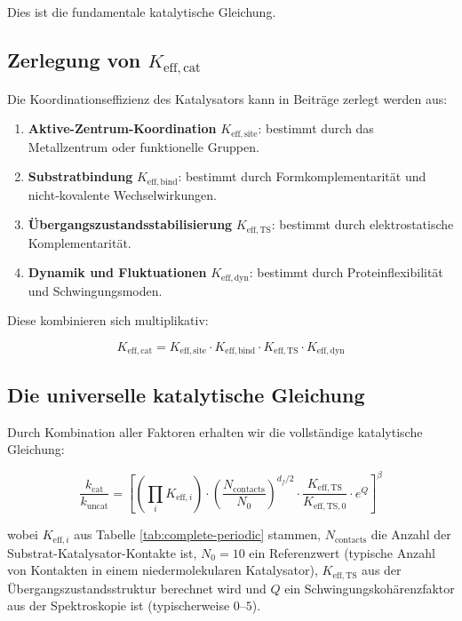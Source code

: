 \documentclass[12pt,a4paper]{article}
\newcommand{\df}{d_{\!f}}
\begin{document}
	Dies ist die fundamentale katalytische Gleichung.
	
	\subsection{Zerlegung von \(K_{\mathrm{eff},\text{cat}}\)}
	
	Die Koordinationseffizienz des Katalysators kann in Beiträge zerlegt werden aus:
	\begin{enumerate}
		\item \textbf{Aktive-Zentrum-Koordination} \(K_{\mathrm{eff},\text{site}}\): bestimmt durch das Metallzentrum oder funktionelle Gruppen.
		\item \textbf{Substratbindung} \(K_{\mathrm{eff},\text{bind}}\): bestimmt durch Formkomplementarität und nicht-kovalente Wechselwirkungen.
		\item \textbf{Übergangszustandsstabilisierung} \(K_{\mathrm{eff},\text{TS}}\): bestimmt durch elektrostatische Komplementarität.
		\item \textbf{Dynamik und Fluktuationen} \(K_{\mathrm{eff},\text{dyn}}\): bestimmt durch Proteinflexibilität und Schwingungsmoden.
	\end{enumerate}
	
	Diese kombinieren sich multiplikativ:
	
	\begin{equation}
		K_{\mathrm{eff},\text{cat}} = K_{\mathrm{eff},\text{site}} \cdot K_{\mathrm{eff},\text{bind}} \cdot K_{\mathrm{eff},\text{TS}} \cdot K_{\mathrm{eff},\text{dyn}}
		\label{eq:keff-cat}
	\end{equation}
	
	\subsection{Die universelle katalytische Gleichung}
	
	Durch Kombination aller Faktoren erhalten wir die vollständige katalytische Gleichung:
	
	\begin{equation}
		\boxed{\frac{k_{\text{cat}}}{k_{\text{uncat}}} = \left[ \left(\prod_i K_{\mathrm{eff},i}\right) \cdot \left(\frac{N_{\text{contacts}}}{N_0}\right)^{\df/2} \cdot \frac{K_{\mathrm{eff},\text{TS}}}{K_{\mathrm{eff},\text{TS},0}} \cdot e^{Q} \right]^{\beta}}
		\label{eq:cat-universal}
	\end{equation}
	
	wobei $K_{\mathrm{eff},i}$ aus Tabelle \ref{tab:complete-periodic} stammen, $N_{\text{contacts}}$ die Anzahl der Substrat-Katalysator-Kontakte ist, $N_0 = 10$ ein Referenzwert (typische Anzahl von Kontakten in einem niedermolekularen Katalysator), $K_{\mathrm{eff},\text{TS}}$ aus der Übergangszustandsstruktur berechnet wird und $Q$ ein Schwingungskohärenzfaktor aus der Spektroskopie ist (typischerweise $0$--$5$).
	
\end{document}
